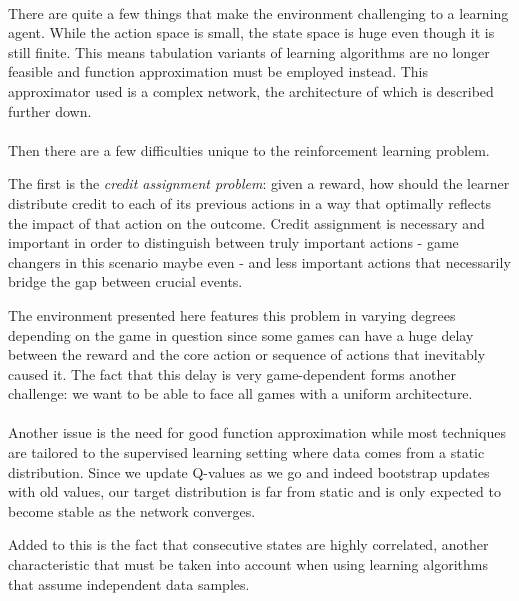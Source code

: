 \paragraph{}
There are quite a few things that make the environment
challenging to a learning agent.
While the action space is small,
the state space is huge even though it is still finite.
This means tabulation variants of learning algorithms
are no longer feasible and function approximation must be employed instead.
This approximator used is a complex network,
the architecture of which is described further down.

\paragraph{}
Then there are a few difficulties
unique to the reinforcement learning problem.

The first is the \textit{credit assignment problem}:
given a reward,
how should the learner distribute credit to each of its previous actions
in a way that optimally reflects the impact of that action on the outcome.
Credit assignment is necessary and important
in order to distinguish between truly important actions
- game changers in this scenario maybe even -
and less important actions
that necessarily bridge the gap between crucial events.

The environment presented here features this problem
in varying degrees depending on the game in question
since some games can have a huge delay between
the reward and the core action or sequence of actions
that inevitably caused it.
The fact that this delay is very game-dependent
forms another challenge:
we want to be able to face all games with a uniform architecture.

\paragraph{}
Another issue is the need for good function approximation
while most techniques are tailored to the supervised learning setting
where data comes from a static distribution.
Since we update Q-values as we go
and indeed bootstrap updates with old values,
our target distribution is far from static and
is only expected to become stable
as the network converges.

Added to this is the fact that consecutive states
are highly correlated,
another characteristic that must be taken into account
when using learning algorithms
that assume independent data samples.

